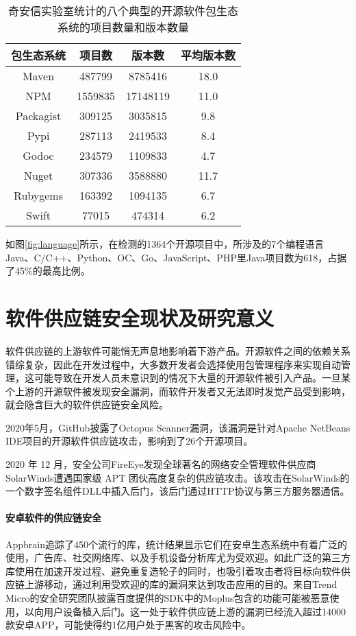 \begin{table}[!hpt]
  \caption{奇安信实验室统计的八个典型的开源软件包生态系统的项目数量和版本数量}
  \label{tab:version}
  \centering
  \begin{tabular}{cccc} \toprule
    包生态系统 & 项目数 & 版本数 & 平均版本数 \\ \midrule
	Maven & 487799 & 8785416 & 18.0 \\
	NPM & 1559835 & 17148119 & 11.0 \\
	Packagist & 309125 & 3035815 & 9.8 \\
	Pypi & 287113 & 2419533 & 8.4 \\
	Godoc & 234579 & 1109833 & 4.7 \\
	Nuget & 307336 & 3588880 & 11.7 \\
	Rubygems & 163392 & 1094135 & 6.7 \\
	Swift & 77015 & 474314 & 6.2 \\ \bottomrule
  \end{tabular}
\end{table}

如图\ref{fig:language}所示，在检测的1364个开源项目中，所涉及的7个编程语言Java、C/C++、Python、OC、Go、JavaScript、PHP里Java项目数为618，占据了45\%的最高比例。




\section{软件供应链安全现状及研究意义}
软件供应链的上游软件可能悄无声息地影响着下游产品。开源软件之间的依赖关系错综复杂，因此在开发过程中，大多数开发者会选择使用包管理程序来实现自动管理，这可能导致在开发人员未意识到的情况下大量的开源软件被引入产品。一旦某个上游的开源软件被发现安全漏洞，而软件开发者又无法即时发觉产品受到影响，就会隐含巨大的软件供应链安全风险。

2020年5月，GitHub披露了Octopus Scanner漏洞\cite{octopus}，该漏洞是针对Apache NetBeans IDE项目的开源软件供应链攻击，影响到了26个开源项目。

2020 年 12 月，安全公司FireEye发现全球著名的网络安全管理软件供应商 SolarWinds遭遇国家级 APT 团伙高度复杂的供应链攻击。该攻击在SolarWinds的一个数字签名组件DLL中插入后门，该后门通过HTTP协议与第三方服务器通信。

\paragraph{安卓软件的供应链安全} Appbrain\cite{appbrain}追踪了450个流行的库，统计结果显示它们在安卓生态系统中有着广泛的使用，广告库、社交网络库、以及手机设备分析库尤为受欢迎。如此广泛的第三方库使用在加速开发过程、避免重复造轮子的同时，也吸引着攻击者将目标向软件供应链上游移动，通过利用受欢迎的库的漏洞来达到攻击应用的目的。来自Trend Micro的安全研究团队披露百度提供的SDK中的Moplus包含的功能可能被恶意使用，以向用户设备植入后门\cite{baidu}。这一处于软件供应链上游的漏洞已经流入超过14000款安卓APP，可能使得约1亿用户处于黑客的攻击风险中。

